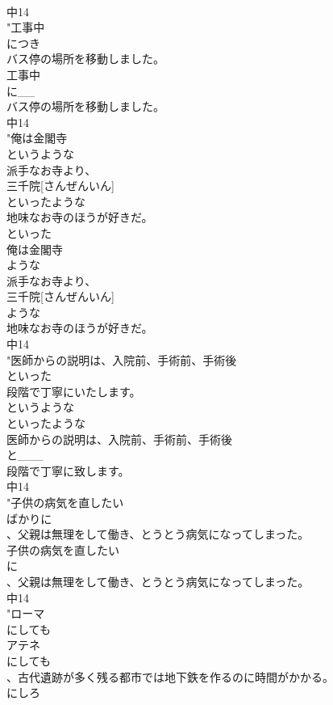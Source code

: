 \documentclass[8pt]{extreport}
\begin{document}
\begin{CJK}{UTF8}{min}
\\	中14
\\	"工事中
\\	につき
\\	バス停の場所を移動しました。
\\	工事中
\\	に__
\\	バス停の場所を移動しました。
\\	中14
\\	"俺は金閣寺
\\	というような
\\	派手なお寺より、
\\	三千院[さんぜんいん]
\\	といったような
\\	地味なお寺のほうが好きだ。　
\\	といった
\\	俺は金閣寺
\\	ような
\\	派手なお寺より、
\\	三千院[さんぜんいん]
\\	ような
\\	地味なお寺のほうが好きだ。
\\	中14
\\	"医師からの説明は、入院前、手術前、手術後
\\	といった
\\	段階で丁寧にいたします。　
\\	というような
\\	といったような
\\	医師からの説明は、入院前、手術前、手術後
\\	と___
\\	段階で丁寧に致します。
\\	中14
\\	"子供の病気を直したい
\\	ばかりに
\\	、父親は無理をして働き、とうとう病気になってしまった。
\\	子供の病気を直したい
\\	に
\\	、父親は無理をして働き、とうとう病気になってしまった。
\\	中14
\\	"ローマ
\\	にしても
\\	アテネ
\\	にしても
\\	、古代遺跡が多く残る都市では地下鉄を作るのに時間がかかる。 
\\	にしろ

\end{CJK}
\end{document}
